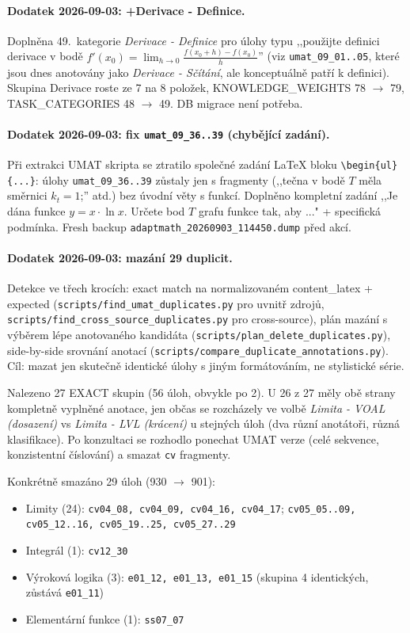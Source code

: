 \documentclass[11pt,a4paper]{article}
\begin{document}
\paragraph{Dodatek 2026-09-03: +Derivace - Definice.} Doplněna 49.~kategorie \emph{Derivace - Definice} pro úlohy typu ,,použijte definici derivace v bodě $f'(x_0) = \lim_{h \to 0}\frac{f(x_0+h)-f(x_0)}{h}$'' (viz \texttt{umat\_09\_01..05}, které jsou dnes anotovány jako \emph{Derivace - Sčítání}, ale konceptuálně patří k definici). Skupina Derivace roste ze 7 na 8 položek, KNOWLEDGE\_WEIGHTS 78 $\rightarrow$ 79, TASK\_CATEGORIES 48 $\rightarrow$ 49. DB migrace není potřeba.

\paragraph{Dodatek 2026-09-03: fix \texttt{umat\_09\_36..39} (chybějící zadání).} Při extrakci UMAT skripta se ztratilo společné zadání LaTeX bloku \texttt{\textbackslash begin\{ul\}\{...\}}: úlohy \texttt{umat\_09\_36..39} zůstaly jen s fragmenty (,,tečna v bodě $T$ měla směrnici $k_t=1$;'' atd.) bez úvodní věty s funkcí. Doplněno kompletní zadání ,,Je dána funkce $y = x \cdot \ln x$. Určete bod $T$ grafu funkce tak, aby ..." + specifická podmínka. Fresh backup \texttt{adaptmath\_20260903\_114450.dump} před akcí.

\paragraph{Dodatek 2026-09-03: mazání 29 duplicit.} Detekce ve třech krocích: exact match na normalizovaném content\_latex + expected (\texttt{scripts/find\_umat\_duplicates.py} pro uvnitř zdrojů, \texttt{scripts/find\_cross\_source\_duplicates.py} pro cross-source), plán mazání s výběrem lépe anotovaného kandidáta (\texttt{scripts/plan\_delete\_duplicates.py}), side-by-side srovnání anotací (\texttt{scripts/compare\_duplicate\_annotations.py}). Cíl: mazat jen skutečně identické úlohy s jiným formátováním, ne stylistické série.

Nalezeno 27 EXACT skupin (56 úloh, obvykle po 2). U 26 z 27 měly obě strany kompletně vyplněné anotace, jen občas se rozcházely ve volbě \emph{Limita - VOAL (dosazení)} vs \emph{Limita - LVL (krácení)} u stejných úloh (dva různí anotátoři, různá klasifikace). Po konzultaci se rozhodlo ponechat UMAT verze (celé sekvence, konzistentní číslování) a smazat \texttt{cv} fragmenty.

Konkrétně smazáno 29 úloh (930 $\rightarrow$ 901):
\begin{itemize}
  \item Limity (24): \texttt{cv04\_08, cv04\_09, cv04\_16, cv04\_17}; \texttt{cv05\_05..09, cv05\_12..16, cv05\_19..25, cv05\_27..29}
  \item Integrál (1): \texttt{cv12\_30}
  \item Výroková logika (3): \texttt{e01\_12, e01\_13, e01\_15} (skupina 4 identických, zůstává \texttt{e01\_11})
  \item Elementární funkce (1): \texttt{ss07\_07}
\end{itemize}
\end{document}
